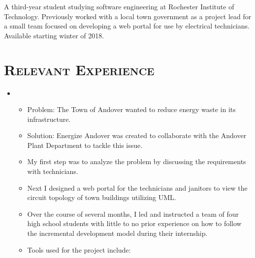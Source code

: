 \documentclass[10pt,letter,roman]{moderncv}
\begin{document}
\makecvtitle

\small{A third-year student studying software engineering at Rochester Institute of Technology. Previously worked with a local town government as a project lead for a small team focused on developing a web portal for use by electrical technicians. Available starting winter of 2018.}

\section{\textsc{Relevant Experience}}

\begin{itemize}

\item{}
  \begin{itemize}
    \item Problem: The Town of Andover wanted to reduce energy waste in its infrastructure.
    \item Solution: Energize Andover was created to collaborate with the Andover Plant Department to tackle this issue.
    \item	My first step was to analyze the problem by discussing the requirements with technicians.
    \item	Next I designed a web portal for the technicians and janitors to view the circuit topology of town buildings utilizing UML.
    \item	Over the course of several months, I led and instructed a team of four high school students with little to no prior experience on how to follow the incremental development model during their internship.
    \item	Tools used for the project include:
    \begin{itemize}
    \end{itemize}
  \end{itemize}


\end{itemize}
\end{document}

